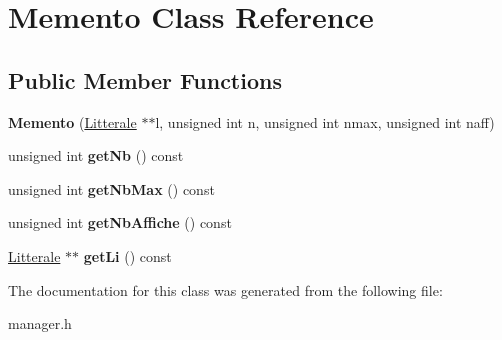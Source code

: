 \hypertarget{class_memento}{}\section{Memento Class Reference}
\label{class_memento}
\subsection*{Public Member Functions}
\begin{DoxyCompactItemize}
\item 
{\bfseries Memento} (\hyperlink{class_litterale}{Litterale} $\ast$$\ast$l, unsigned int n, unsigned int nmax, unsigned int naff)\hypertarget{class_memento_a7d4237ea6a8300c6018e2a44090f333d}{}\label{class_memento_a7d4237ea6a8300c6018e2a44090f333d}

\item 
unsigned int {\bfseries get\+Nb} () const \hypertarget{class_memento_a773dd66df5272e0d78b849b3a0d1678f}{}\label{class_memento_a773dd66df5272e0d78b849b3a0d1678f}

\item 
unsigned int {\bfseries get\+Nb\+Max} () const \hypertarget{class_memento_a65ff8c9c8c968294a6fc4efb56a84b72}{}\label{class_memento_a65ff8c9c8c968294a6fc4efb56a84b72}

\item 
unsigned int {\bfseries get\+Nb\+Affiche} () const \hypertarget{class_memento_a7cee4f9bdb0a66cfe246104804f7495f}{}\label{class_memento_a7cee4f9bdb0a66cfe246104804f7495f}

\item 
\hyperlink{class_litterale}{Litterale} $\ast$$\ast$ {\bfseries get\+Li} () const \hypertarget{class_memento_a81b870066375204cbf460038d30f1e37}{}\label{class_memento_a81b870066375204cbf460038d30f1e37}

\end{DoxyCompactItemize}


The documentation for this class was generated from the following file\+:\begin{DoxyCompactItemize}
\item 
manager.\+h\end{DoxyCompactItemize}
